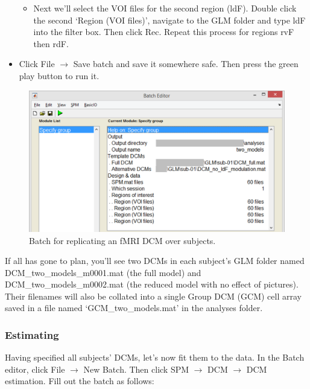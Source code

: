 \documentclass{article}
\begin{document}
\begin{itemize}
\begin{itemize}
\item Next we'll select the VOI files for the second region (ldF). Double click the second `Region (VOI files)', navigate to the GLM folder and type ldF into the filter box. Then click Rec. Repeat this process for regions rvF then rdF.

\end{itemize}
\item Click File $\rightarrow$ Save batch and save it somewhere safe. Then press the green play button to run it.
\end{itemize}

\begin{figure}[ht]
\begin{center}
\includegraphics[width=\textwidth]{"Fig_batch_specify_group"}
\caption{Batch for replicating an fMRI DCM over subjects. \label{Fig_batch_specify_group}}
\end{center}
\end{figure}

If all has gone to plan, you'll see two DCMs in each subject's GLM folder named DCM\_two\_models\_m0001.mat (the full model) and DCM\_two\_models\_m0002.mat (the reduced model with no effect of pictures). Their filenames will also be collated into a single Group DCM (GCM) cell array saved in a file named `GCM\_two\_models.mat' in the analyses folder.

\subsubsection{Estimating} \label{GUI_estimation}

Having specified all subjects' DCMs, let's now fit them to the data. In the Batch editor, click File $\rightarrow$ New Batch. Then click SPM $\rightarrow$ DCM $\rightarrow$ DCM estimation. Fill out the batch as follows:
\end{document}
